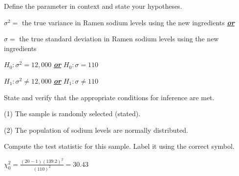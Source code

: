 \documentclass[noanswers]{exam}
\begin{document}
\begin{questions}	
	
	\question Define the parameter in context and state your hypotheses.
		
	\begin{solution}[\stretch{1}]

	\vspace{1mm}
	
	$\sigma^2=$ the true variance in Ramen sodium levels using the new ingredients \textbf{\textit{\underline{or}}}
	
	$\sigma=$ the true standard deviation in Ramen sodium levels using the new ingredients
	
	\vspace{3mm}
	
	$H_0: \sigma^2=12,000$ \hspace{10mm} \textbf{\textit{\underline{or}}} \hspace{10mm} $H_0:\sigma=110$
	
	$H_1: \sigma^2\neq 12,000$\hspace{11mm} \textbf{\textit{\underline{or}}} \hspace{10mm} $H_1:\sigma\neq 110$
	
	\vspace{1mm}
	
	\end{solution}
	
	\question State and verify that the appropriate conditions for inference are met.
	
	\begin{solution}[\stretch{1}]
	
	\vspace{1mm}
	
	(1) The sample is randomly selected (stated).
	
	(2) The population of sodium levels are normally distributed.
	
	\vspace{1mm}	
	
	\end{solution}
	
	\question Compute the test statistic for this sample. Label it using the correct symbol.
	
	\begin{solution}[\stretch{1}]
	
	\vspace{1mm}
	
	$\chi_0^2=\displaystyle \frac{(20-1)(139.2)^2}{(110)^2}=30.43$
	

\end{solution}
\end{questions}
\end{document}
